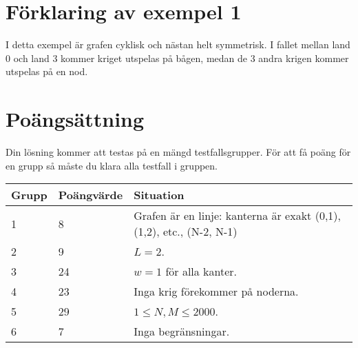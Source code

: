 \section*{Förklaring av exempel 1}

I detta exempel är grafen cyklisk och nästan helt symmetrisk. I fallet mellan
land 0 och land 3 kommer kriget utspelas på bågen, medan de 3 andra krigen
kommer utspelas på en nod.

\section*{Poängsättning}

Din lösning kommer att testas på en mängd testfallsgrupper. För att få poäng för en grupp
så måste du klara alla testfall i gruppen.

\begin{tabular}{| l | l | l |}
\hline
Grupp & Poängvärde & Situation \\ \hline
1     & 8          & Grafen är en linje: kanterna är exakt (0,1), (1,2), etc., (N-2, N-1) \\ \hline
2     & 9          & $L = 2$. \\ \hline
3     & 24         & $w = 1$ för alla kanter. \\ \hline
4     & 23         & Inga krig förekommer på noderna. \\ \hline
5     & 29         & $1 \le N, M \le 2000$. \\ \hline
6     & 7          & Inga begränsningar. \\ \hline
\end{tabular}
